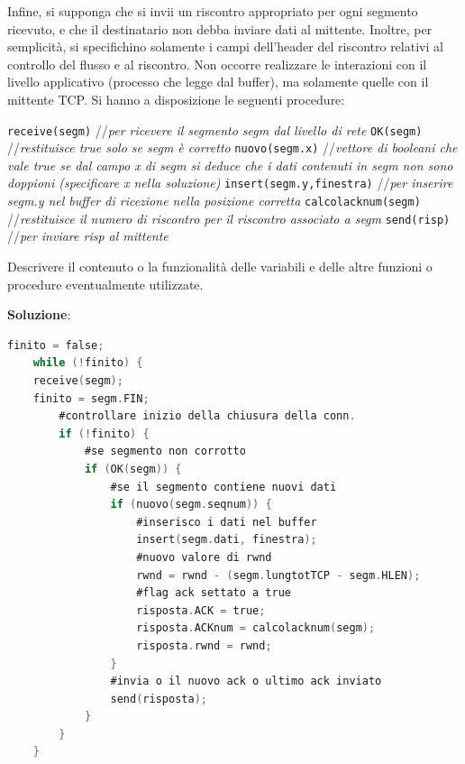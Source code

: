 \documentclass[11pt,a4paper]{article}
\theoremstyle{definition}
\begin{document}
\begin{enumerate}
	      Infine, si supponga che si invii un riscontro appropriato per ogni segmento ricevuto, e che il destinatario non debba inviare dati al mittente. Inoltre, per semplicità, si specifichino solamente i campi dell’header del riscontro relativi al controllo del flusso e al riscontro. Non occorre realizzare le interazioni con il livello
	      applicativo (processo che legge dal buffer), ma solamente quelle con il mittente TCP.
	      Si hanno a disposizione le seguenti procedure:
	      \begin{flushleft}
		      \texttt{receive(segm)} //\textit{per ricevere il segmento segm dal livello di rete}\newline
		      \texttt{OK(segm)} //\textit{restituisce true solo se segm è corretto}\newline
		      \texttt{nuovo(segm.x)} //\textit{vettore di booleani che vale true se dal campo x di segm si deduce che i dati contenuti in segm non sono doppioni (specificare x nella soluzione)}\newline
		      \texttt{insert(segm.y,finestra)} //\textit{per inserire segm.y nel buffer di ricezione nella posizione corretta}\newline
		      \texttt{calcolacknum(segm)} //\textit{restituisce il numero di riscontro per il riscontro associato a segm}\newline
		      \texttt{send(risp)} //\textit{per inviare risp al mittente}\newline
	      \end{flushleft}
	      Descrivere il contenuto o la funzionalità delle variabili e delle altre funzioni o procedure eventualmente utilizzate.
	      \newpage
	      \begin{flushleft}
		      \textbf{Soluzione}:
		      \begin{lstlisting}[gobble=2,language=C,basicstyle=\footnotesize]
	finito = false;
	while (!finito) { 
	receive(segm);
	finito = segm.FIN; 
		#controllare inizio della chiusura della conn.
		if (!finito) {
			#se segmento non corrotto
			if (OK(segm)) { 
				#se il segmento contiene nuovi dati
				if (nuovo(segm.seqnum)) { 
					#inserisco i dati nel buffer
					insert(segm.dati, finestra); 
					#nuovo valore di rwnd
					rwnd = rwnd - (segm.lungtotTCP - segm.HLEN); 
					#flag ack settato a true
					risposta.ACK = true; 
					risposta.ACKnum = calcolacknum(segm);
					risposta.rwnd = rwnd;
				}
 				#invia o il nuovo ack o ultimo ack inviato
				send(risposta); 
			}
		}
	}
	\end{lstlisting}
	      \end{flushleft}

\end{enumerate}
\end{document}

